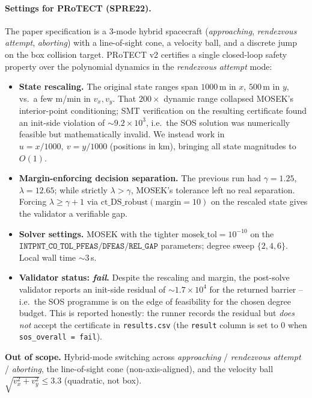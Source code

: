 \documentclass[11pt,a4paper]{article}
\newcommand{\settings}[1]{\paragraph{Settings for PRoTECT (#1).}}
\begin{document}
\settings{SPRE22}
The paper specification is a 3-mode hybrid spacecraft
(\emph{approaching}, \emph{rendezvous attempt}, \emph{aborting}) with a
line-of-sight cone, a velocity ball, and a discrete jump on the box
collision target. PRoTECT v2 certifies a single closed-loop safety
property over the polynomial dynamics in the \emph{rendezvous attempt}
mode:
\begin{itemize}
  \item \textbf{State rescaling.} The original state ranges span
        $1000\,$m in $x$, $500\,$m in $y$, vs.\ a few m/min in
        $v_x, v_y$. That $200\times$ dynamic range collapsed MOSEK's
        interior-point conditioning; SMT verification on the resulting
        certificate found an init-side violation of
        $\sim 9.2\times 10^{3}$, i.e.\ the SOS solution was
        numerically feasible but mathematically invalid. We instead
        work in $u = x/1000,\ v = y/1000$ (positions in km), bringing
        all state magnitudes to $O(1)$.
  \item \textbf{Margin-enforcing decision separation.} The previous
        run had $\gamma = 1.25$, $\lambda = 12.65$; while strictly
        $\lambda > \gamma$, MOSEK's tolerance left no real separation.
        Forcing $\lambda \ge \gamma + 1$ via
        $\mathrm{ct\_DS\_robust(margin{=}10)}$ on the rescaled state
        gives the validator a verifiable gap.
  \item \textbf{Solver settings.} MOSEK with the tighter
        $\mathrm{mosek\_tol} = 10^{-10}$ on the
        $\texttt{INTPNT\_CO\_TOL\_PFEAS/DFEAS/REL\_GAP}$ parameters;
        degree sweep $\{2, 4, 6\}$. Local wall time $\sim 3\,$s.
  \item \textbf{Validator status: \emph{fail}.} Despite the rescaling
        and margin, the post-solve validator reports an init-side
        residual of $\sim 1.7 \times 10^4$ for the returned barrier --
        i.e.\ the SOS programme is on the edge of feasibility for the
        chosen degree budget. This is reported honestly: the runner
        records the residual but \emph{does not} accept the certificate
        in \texttt{results.csv} (the \texttt{result} column is set to
        $0$ when \texttt{sos\_overall = fail}).
\end{itemize}
\textbf{Out of scope.} Hybrid-mode switching across
\emph{approaching} / \emph{rendezvous attempt} / \emph{aborting},
the line-of-sight cone (non-axis-aligned), and the velocity ball
$\sqrt{v_x^2 + v_y^2} \le 3.3$ (quadratic, not box).
\end{document}
